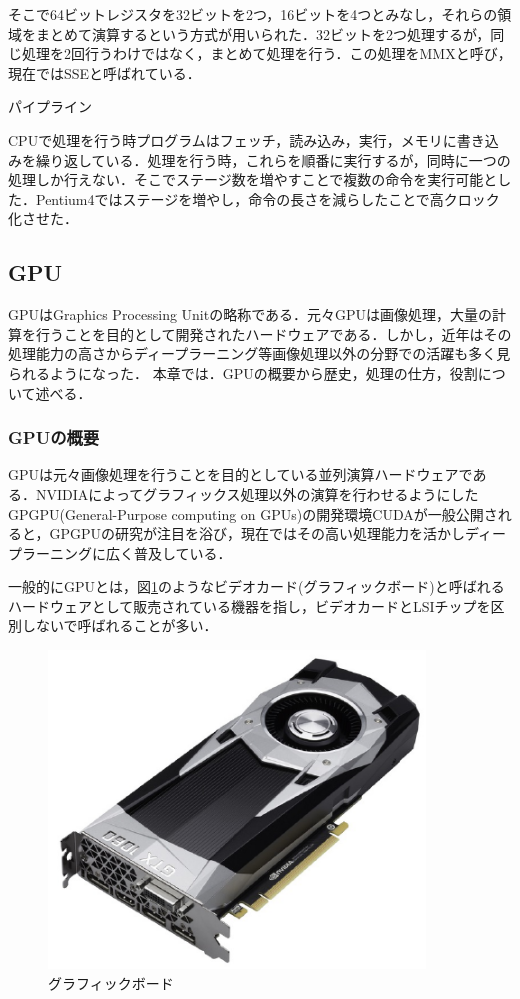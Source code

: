 \documentclass[a4j,12pt]{jsarticle}
\begin{document}
そこで64ビットレジスタを32ビットを2つ，16ビットを4つとみなし，それらの領域をまとめて演算するという方式が用いられた．32ビットを2つ処理するが，同じ処理を2回行うわけではなく，まとめて処理を行う．この処理をMMXと呼び，現在ではSSEと呼ばれている．


\begin{Large}
パイプライン
\end {Large}
CPUで処理を行う時プログラムはフェッチ，読み込み，実行，メモリに書き込みを繰り返している．処理を行う時，これらを順番に実行するが，同時に一つの処理しか行えない．そこでステージ数を増やすことで複数の命令を実行可能とした．Pentium4ではステージを増やし，命令の長さを減らしたことで高クロック化させた．


\subsection{GPU}
GPUはGraphics Processing Unitの略称である．元々GPUは画像処理，大量の計算を行うことを目的として開発されたハードウェアである．しかし，近年はその処理能力の高さからディープラーニング等画像処理以外の分野での活躍も多く見られるようになった．
本章では．GPUの概要から歴史，処理の仕方，役割について述べる．


\subsubsection{GPUの概要}
GPUは元々画像処理を行うことを目的としている並列演算ハードウェアである．NVIDIAによってグラフィックス処理以外の演算を行わせるようにしたGPGPU(General-Purpose computing on GPUs)の開発環境CUDAが一般公開されると，GPGPUの研究が注目を浴び，現在ではその高い処理能力を活かしディープラーニングに広く普及している．

一般的にGPUとは，図\ref{fig:gpu}のようなビデオカード(グラフィックボード)と呼ばれるハードウェアとして販売されている機器を指し，ビデオカードとLSIチップを区別しないで呼ばれることが多い．

\begin{figure}[htbp]
 \begin{center}
  \includegraphics[width=100mm]{GPU.pdf}
 \end{center}
 \caption{グラフィックボード}
 \label{fig:gpu}
\end{figure}
\end{document}
